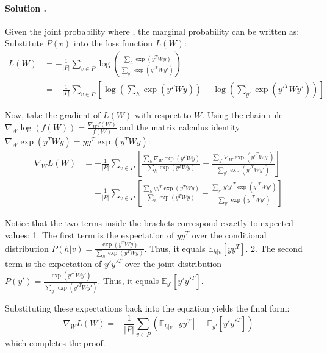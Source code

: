 \documentclass{article}
\newcounter{solutionCount}
\newcommand{\solution}[1]{
    \stepcounter{solutionCount}
    \paragraph{Solution \thesolutionCount.}
    {
        #1
    }
}
\begin{document}
\solution{
Given the joint probability 
 where , the marginal probability  can be written as:
Substitute $P(v)$ into the loss function $L(W)$:
\begin{align*}
    L(W) &= -\frac{1}{|P|} \sum_{v \in P} \log \left( \frac{\sum_{h} \exp(y^T W y)}{\sum_{y'} \exp(y'^T W y')} \right) \\
    &= -\frac{1}{|P|} \sum_{v \in P} \left[ \log \left( \sum_{h} \exp(y^T W y) \right) - \log \left( \sum_{y'} \exp(y'^T W y') \right) \right]
\end{align*}

Now, take the gradient of $L(W)$ with respect to $W$. Using the chain rule $\nabla_W \log(f(W)) = \frac{\nabla_W f(W)}{f(W)}$ and the matrix calculus identity $\nabla_W \exp(y^T W y) = y y^T \exp(y^T W y)$:
\begin{align*}
    \nabla_W L(W) &= -\frac{1}{|P|} \sum_{v \in P} \left[ \frac{\sum_{h} \nabla_W \exp(y^T W y)}{\sum_{h} \exp(y^T W y)} - \frac{\sum_{y'} \nabla_W \exp(y'^T W y')}{\sum_{y'} \exp(y'^T W y')} \right] \\
    &= -\frac{1}{|P|} \sum_{v \in P} \left[ \frac{\sum_{h} y y^T \exp(y^T W y)}{\sum_{h} \exp(y^T W y)} - \frac{\sum_{y'} y' y'^T \exp(y'^T W y')}{\sum_{y'} \exp(y'^T W y')} \right]
\end{align*}

Notice that the two terms inside the brackets correspond exactly to expected values:
1. The first term is the expectation of $y y^T$ over the conditional distribution $P(h|v) = \frac{\exp(y^T W y)}{\sum_{h} \exp(y^T W y)}$. Thus, it equals $\mathbb{E}_{h|v}[y y^T]$.
2. The second term is the expectation of $y' y'^T$ over the joint distribution $P(y') = \frac{\exp(y'^T W y')}{\sum_{y'} \exp(y'^T W y')}$. Thus, it equals $\mathbb{E}_{y'}[y' y'^T]$.

Substituting these expectations back into the equation yields the final form:
$$\nabla_W L(W) = -\frac{1}{|P|} \sum_{v \in P} \left( \mathbb{E}_{h|v}[y y^T] - \mathbb{E}_{y'}[y' y'^T] \right)$$
which completes the proof.
}
\end{document}
